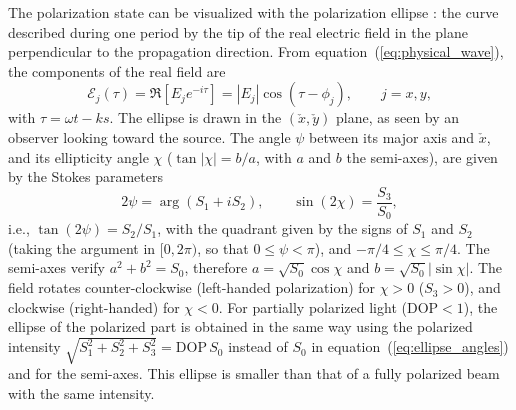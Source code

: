 \documentclass{iucr}
\begin{document}
The polarization state can be visualized with the polarization ellipse \cite{Detlefs2012}: the curve described during one period by the tip of the real electric field in the plane perpendicular to the propagation direction. From equation~(\ref{eq:physical_wave}), the components of the real field are
\begin{equation}\label{eq:ellipse_field}
    \mathcal{E}_{j}(\tau)=\Re\left[E_j e^{-i\tau}\right]=|E_j|\cos(\tau-\phi_j), \qquad j=x,y,
\end{equation}
with $\tau=\omega t - k s$. The ellipse is drawn in the $(\check{x},\check{y})$ plane, as seen by an observer looking toward the source. The angle $\psi$ between its major axis and $\check{x}$, and its ellipticity angle $\chi$ ($\tan|\chi|=b/a$, with $a$ and $b$ the semi-axes), are given by the Stokes parameters \cite{Detlefs2012}
\begin{equation}\label{eq:ellipse_angles}
    2\psi=\arg(S_1+iS_2), \qquad \sin(2\chi)=\frac{S_3}{S_0},
\end{equation}
i.e., $\tan(2\psi)=S_2/S_1$, with the quadrant given by the signs of $S_1$ and $S_2$ (taking the argument in $[0,2\pi)$, so that $0\le\psi<\pi$), and $-\pi/4\le\chi\le\pi/4$. The semi-axes verify $a^2+b^2=S_0$, therefore $a=\sqrt{S_0}\cos\chi$ and $b=\sqrt{S_0}|\sin\chi|$. The field rotates counter-clockwise (left-handed polarization) for $\chi>0$ ($S_3>0$), and clockwise (right-handed) for $\chi<0$.
For partially polarized light (DOP$<1$), the ellipse of the polarized part is obtained in the same way using the polarized intensity $\sqrt{S_1^2+S_2^2+S_3^2}=\mathrm{DOP}\,S_0$ instead of $S_0$ in equation~(\ref{eq:ellipse_angles}) and for the semi-axes. This ellipse is smaller than that of a fully polarized beam with the same intensity.
\end{document}

